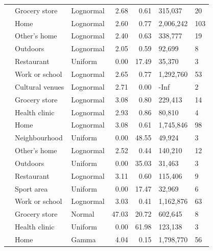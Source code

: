 \documentclass[preprint, 3p,
authoryear]{elsarticle} %
\begin{document}
\begin{table}
{\begin{threeparttable}
\begin{tabular}[t]{rllrrll}
 & Grocery store & Lognormal & 2.68 & 0.61 & 315,037 & 20\\

 & Home & Lognormal & 2.60 & 0.77 & 2,006,242 & 103\\

 & Other's home & Lognormal & 2.40 & 0.63 & 338,777 & 19\\

 & Outdoors & Lognormal & 2.05 & 0.59 & 92,699 & 8\\

 & Restaurant & Uniform & 0.00 & 17.49 & 35,370 & 3\\

\multirow[t]{-7}{*}{\raggedleft\arraybackslash 2010} & Work or school & Lognormal & 2.65 & 0.77 & 1,292,760 & 53\\
\cmidrule{1-7}
 & Cultural venues & Lognormal & 2.71 & 0.00 & -Inf & 2\\

 & Grocery store & Lognormal & 3.08 & 0.80 & 229,413 & 14\\

 & Health clinic & Lognormal & 2.93 & 0.86 & 80,810 & 4\\

 & Home & Lognormal & 3.08 & 0.61 & 1,745,846 & 98\\

 & Neighbourhood & Uniform & 0.00 & 48.55 & 49,924 & 3\\

 & Other's home & Lognormal & 2.52 & 0.44 & 140,210 & 12\\

 & Outdoors & Uniform & 0.00 & 35.03 & 31,463 & 3\\

 & Restaurant & Lognormal & 3.11 & 0.60 & 115,406 & 9\\

 & Sport area & Uniform & 0.00 & 17.47 & 32,969 & 6\\

\multirow[t]{-10}{*}{\raggedleft\arraybackslash 2015} & Work or school & Lognormal & 3.03 & 0.41 & 1,162,876 & 63\\
\cmidrule{1-7}
 & Grocery store & Normal & 47.03 & 20.72 & 602,645 & 8\\

 & Health clinic & Uniform & 0.00 & 61.98 & 123,138 & 3\\

 & Home & Gamma & 4.04 & 0.15 & 1,798,770 & 56\\


\end{tabular}
\end{threeparttable}}
\end{table}
\end{document}

